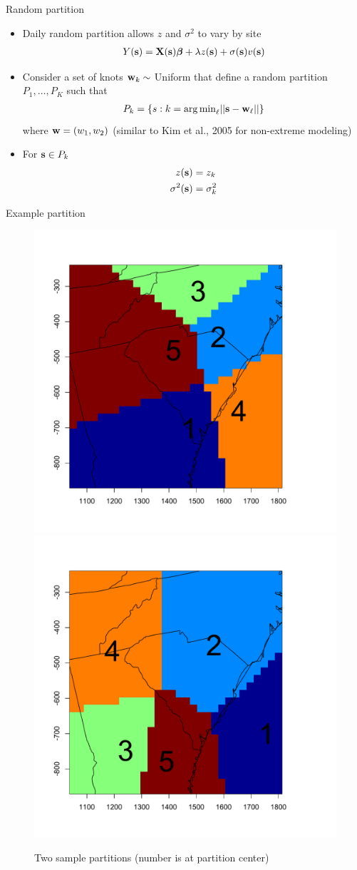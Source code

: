 \documentclass{beamer}
\begin{document}
\begin{frame}{Random partition}
  \begin{itemize} \setlength{\itemsep}{1em}
    \item Daily random partition allows $z$ and $\sigma^2$ to vary by site
    \begin{align*}
      Y(\mbox{\bf s}) = \mbox{\bf X}(\mbox{\bf s}) \mbox{\boldmath $\beta$} + \lambda z(\mbox{\bf s}) + \sigma(\mbox{\bf s}) v(\mbox{\bf s})
    \end{align*}
    \item Consider a set of knots $\mbox{\bf w}_{k} \sim$ Uniform that define a random partition
    $P_{1}, \ldots, P_{K}$ such that
    \begin{align*}
      P_{k} = \{s : k = {\mathop{\rm arg\, min}}_\ell|| \mbox{\bf s} - \mbox{\bf w}_{\ell}|| \}
    \end{align*}
    where $\mbox{\bf w} = (w_1, w_2)$ (similar to Kim et al., 2005 for non-extreme modeling)
    \item For $\mbox{\bf s} \in P_{k}$
    \begin{align*}
      z(\mbox{\bf s}) &= z_{k}\\
      \sigma^2(\mbox{\bf s}) &= \sigma^2_{k}
    \end{align*}
  \end{itemize}
\end{frame}

\begin{frame}{Example partition}
    \centering
    \begin{figure}
    \includegraphics[width=0.54\linewidth, trim=0 0 0 1in]{./plots/pot/example-partition-1.pdf}
    \includegraphics[width=0.54\linewidth, trim=0 0 0 1in]{./plots/pot/example-partition-2.pdf}
    \caption{Two sample partitions (number is at partition center)}
    \end{figure}
\end{frame}
\end{document}
